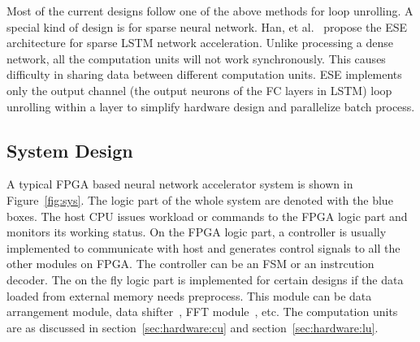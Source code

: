 Most of the current designs follow one of the above methods for loop unrolling. A special kind of design is for sparse neural network. Han, et al.~\cite{han2017ese} propose the ESE architecture for sparse LSTM network acceleration. Unlike processing a dense network, all the computation units will not work synchronously. This causes difficulty in sharing data between different computation units. ESE implements only the output channel (the output neurons of the FC layers in LSTM) loop unrolling within a layer to simplify hardware design and parallelize batch process.

\subsection{System Design}\label{sec:hardware:sys}

A typical FPGA based neural network accelerator system is shown in Figure~\ref{fig:sys}. The logic part of the whole system are denoted with the blue boxes. The host CPU issues workload or commands to the FPGA logic part and monitors its working status. On the FPGA logic part, a controller is usually implemented to communicate with host and generates control signals to all the other modules on FPGA. The controller can be an FSM or an instrcution decoder. The on the fly logic part is implemented for certain designs if the data loaded from external memory needs preprocess. This module can be data arrangement module, data shifter~\cite{qiu2016going}, FFT module~\cite{zhang2017frequency}, etc. The computation units are as discussed in section~\ref{sec:hardware:cu} and section~\ref{sec:hardware:lu}.

